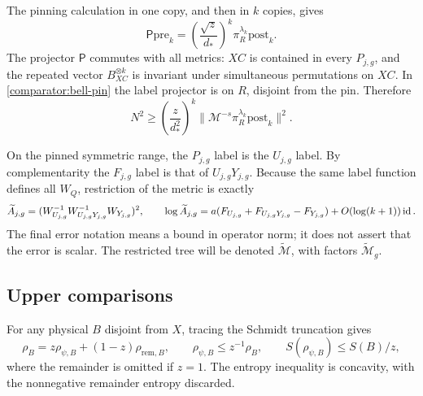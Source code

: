 The pinning calculation in one copy, and then in
$k$ copies, gives
\begin{equation}
 \mathsf P\mathrm{pre}_k
       =\left(\frac{\sqrt z}{d_*}\right)^k
                         \pi_R^{\lambda_k}\mathrm{post}_k.
 \label{comparator:bell-pin}
\end{equation}
The projector $\mathsf P$ commutes with all metrics: $XC$ is contained
in every $P_{j,g}$, and the repeated vector $B_{XC}^{\otimes k}$ is
invariant under simultaneous permutations on $XC$.  In
\eqref{comparator:bell-pin} the label projector is on $R$, disjoint from
the pin.  Therefore
\begin{equation}
 N^2\ge\left(\frac z{d_*^2}\right)^k
       \|\mathcal M^{-s}\pi_R^{\lambda_k}\mathrm{post}_k\|^2.
 \label{comparator:pin-norm}
\end{equation}

On the pinned symmetric range, the $P_{j,g}$ label is the $U_{j,g}$
label.  By complementarity the $F_{j,g}$ label is that of $U_{j,g}Y_{j,g}$.
Because the same label function defines all $W_Q$, restriction of the
metric is exactly
\begin{equation}
 \widetilde A_{j,g}
       =(W_{U_{j,g}}^{-1}W_{U_{j,g}Y_{j,g}}^{-1}W_{Y_{j,g}})^2,
 \qquad
 \log\widetilde A_{j,g}
       =a(F_{U_{j,g}}+F_{U_{j,g}Y_{j,g}}-F_{Y_{j,g}})
                         +O(\log(k+1))\operatorname{id}.
 \label{comparator:pinned-metric}
\end{equation}
The final error notation means a bound in operator norm; it does not
assert that the error is scalar.  The restricted tree will be denoted
$\widetilde{\mathcal M}$, with factors
$\widetilde{\mathcal M}_g$.

\subsection{Upper comparisons}

For any physical $B$ disjoint from $X$, tracing the Schmidt truncation
gives
\begin{equation}
 \rho_B=z\rho_{\psi,B}+(1-z)\rho_{\mathrm{rem},B},
 \qquad
 \rho_{\psi,B}\le z^{-1}\rho_B,
 \qquad S(\rho_{\psi,B})\le S(B)/z,
 \label{comparator:post-marginal}
\end{equation}
where the remainder is omitted if $z=1$.  The entropy inequality is
concavity, with the nonnegative remainder entropy discarded.

